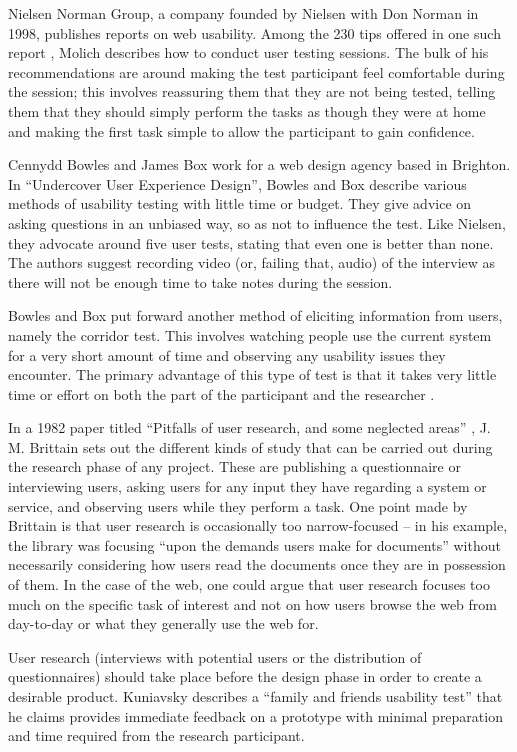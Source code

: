 \documentclass[]{scrartcl}
\begin{document}
Nielsen Norman Group, a company founded by Nielsen with Don Norman in 1998,
publishes reports on web usability. Among the 230 tips offered in one such
report \cite{nng2001tipsusability}, Molich describes how to conduct user
testing sessions. The bulk of his recommendations are around making the test
participant feel comfortable during the session; this involves reassuring them
that they are not being tested, telling them that they should simply perform
the tasks as though they were at home and making the first task simple to
allow the participant to gain confidence.

Cennydd Bowles and James Box work for a web design agency based in Brighton.
In ``Undercover User Experience Design'', Bowles and Box describe various
methods of usability testing with little time or budget. They give advice on
asking questions in an unbiased way, so as not to influence the test. Like
Nielsen, they advocate around five user tests, stating that even one is better
than none. The authors suggest recording video (or, failing that, audio) of
the interview as there will not be enough time to take notes during the
session.

Bowles and Box put forward another method of eliciting information from users,
namely the corridor test. This involves watching people use the current system
for a very short amount of time and observing any usability issues they
encounter. The primary advantage of this type of test is that it takes very
little time or effort on both the part of the participant and the researcher
\cite{bowles2011undercover}.

In a 1982 paper titled ``Pitfalls of user research, and some neglected areas''
\cite{brittain1982pitfalls}, J. M. Brittain sets out the different kinds of
study that can be carried out during the research phase of any project. These
are publishing a questionnaire or interviewing users, asking users for any
input they have regarding a system or service, and observing users while they
perform a task. One point made by Brittain is that user research is
occasionally too narrow-focused -- in his example, the library was focusing
``upon the demands users make for documents'' without necessarily considering
how users read the documents once they are in possession of them. In the case
of the web, one could argue that user research focuses too much on the
specific task of interest and not on how users browse the web from day-to-day
or what they generally use the web for.

User research (interviews with potential users or the distribution of
questionnaires) should take place before the design phase in order to create a
desirable product. Kuniavsky \cite{kuniavsky2003userexperience} describes a
``family and friends usability test'' that he claims provides immediate
feedback on a prototype with minimal preparation and time required from the
research participant.
\end{document}
